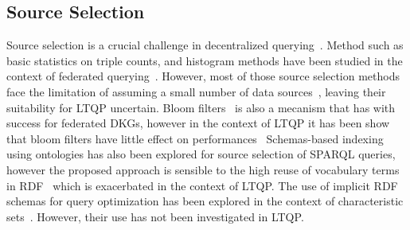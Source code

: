 \subsection{Source Selection}
Source selection is a crucial challenge in decentralized querying~\cite{hose2012towards, Harth2010}.
Method such as basic statistics on triple counts, and histogram methods have been studied in the context of federated querying~\cite{hose2012towards, Harth2010}.
However, most of those source selection methods face the limitation of assuming a small number of data sources~\cite{Harth2010}, leaving their suitability for LTQP uncertain.
Bloom filters~\cite{dia2018fast} is also a mecanism that has with success for federated DKGs, however in the context of LTQP it has been show that bloom filters have little effect on performances~\cite{Hanski2024}
Schemas-based indexing~\cite{Stuckenschmidt2004} using ontologies has also been explored for source selection of SPARQL queries,
however the proposed approach is sensible to the high reuse of vocabulary terms in RDF~\cite{Harth2010} which is exacerbated in the context of LTQP.
The use of implicit RDF schemas for query optimization has been explored in the context of characteristic sets~\cite{Neumann2011CharacteristicSA, Meimaris2017ExtendedCS, Montoya2017}.
However, their use has not been investigated in LTQP.